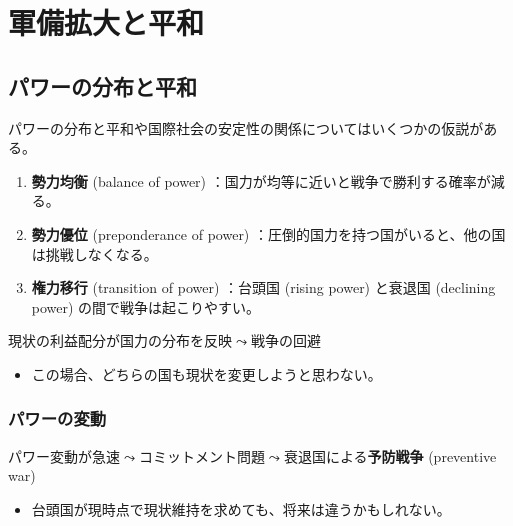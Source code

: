 \documentclass[
  xelatex,
  ja=standard]{bxjsarticle}
\providecommand{\tightlist}{%
  \setlength{\itemsep}{0pt}\setlength{\parskip}{0pt}}\usepackage{longtable,booktabs,array}
\begin{document}
\hypertarget{ux8ecdux5099ux62e1ux5927ux3068ux5e73ux548c}{%
\section{軍備拡大と平和}\label{ux8ecdux5099ux62e1ux5927ux3068ux5e73ux548c}}

\hypertarget{ux30d1ux30efux30fcux306eux5206ux5e03ux3068ux5e73ux548c}{%
\subsection{パワーの分布と平和}\label{ux30d1ux30efux30fcux306eux5206ux5e03ux3068ux5e73ux548c}}

パワーの分布と平和や国際社会の安定性の関係についてはいくつかの仮説がある。

\begin{enumerate}
\def\labelenumi{\arabic{enumi}.}
\tightlist
\item
  \textbf{勢力均衡} (balance of power)
  ：国力が均等に近いと戦争で勝利する確率が減る\citep{waltz2010}。
\item
  \textbf{勢力優位} (preponderance of power)
  ：圧倒的国力を持つ国がいると、他の国は挑戦しなくなる。
\item
  \textbf{権力移行} (transition of power) ：台頭国 (rising power)
  と衰退国 (declining power) の間で戦争は起こりやすい。
\end{enumerate}

現状の利益配分が国力の分布を反映\(\leadsto\)戦争の回避

\begin{itemize}
\tightlist
\item
  この場合、どちらの国も現状を変更しようと思わない。
\end{itemize}

\hypertarget{ux30d1ux30efux30fcux306eux5909ux52d5}{%
\subsubsection{パワーの変動}\label{ux30d1ux30efux30fcux306eux5909ux52d5}}

パワー変動が急速\(\leadsto\)コミットメント問題\(\leadsto\)衰退国による\textbf{予防戦争}
(preventive war)\citep{powell2006}

\begin{itemize}
\tightlist
\item
  台頭国が現時点で現状維持を求めても、将来は違うかもしれない。
\end{itemize}
\end{document}

